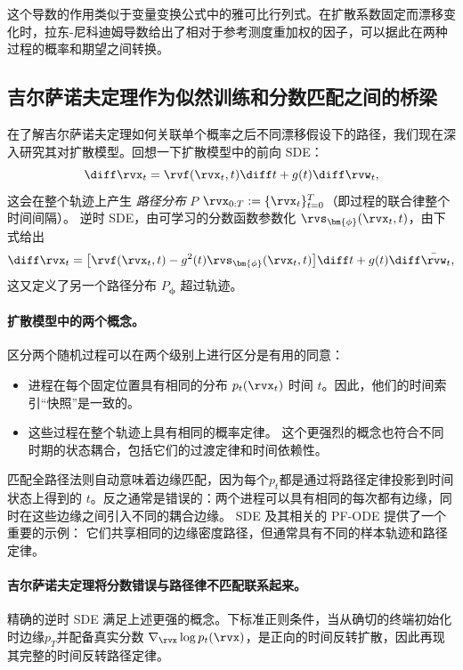 这个导数的作用类似于变量变换公式中的雅可比行列式。在扩散系数固定而漂移变化时，拉东-尼科迪姆导数给出了相对于参考测度重加权的因子，可以据此在两种过程的概率和期望之间转换。

\subsection{吉尔萨诺夫定理作为似然训练和分数匹配之间的桥梁}\label{subsec:girsanov}

在了解吉尔萨诺夫定理如何关联单个概率之后不同漂移假设下的路径，我们现在深入研究其对扩散模型。回想一下扩散模型中的前向 SDE：
\[
\diff \rvx_t = \rvf(\rvx_t, t) \diff t + g(t) \diff \rvw_t,
\]
这会在整个轨迹上产生 \emph{ 路径分布 } $P$
$\rvx_{0:T} := \{\rvx_t\}_{t=0}^T$（即过程的联合律整个时间间隔）。
逆时 SDE，由可学习的分数函数参数化
$\rvs_{\bm{\phi}}(\rvx_t, t)$，由下式给出
\[
\diff \rvx_t = \big[\rvf(\rvx_t, t) - g^2(t) \rvs_{\bm{\phi}}(\rvx_t, t)\big] \diff t
+ g(t) \diff \bar{\rvw}_t,
\]
这又定义了另一个路径分布
$P_{\bm{\phi}}$ 超过轨迹。


\paragraph{扩散模型中的两个概念。}
区分两个随机过程可以在两个级别上进行区分是有用的同意：
\begin{itemize}
    \item {}
    进程在每个固定位置具有相同的分布 $p_t(\rvx_t)$
    时间 $t$。因此，他们的时间索引“快照”是一致的。

    \item {}
    这些过程在整个轨迹上具有相同的概率定律。
    这个更强烈的概念也符合不同时期的状态耦合，包括它们的过渡定律和时间依赖性。
\end{itemize}

匹配全路径法则自动意味着边缘匹配，因为每个$p_t$都是通过将路径定律投影到时间状态上得到的
$t$。反之通常是错误的：两个进程可以具有相同的每次都有边缘，同时在这些边缘之间引入不同的耦合边缘。 SDE 及其相关的 PF-ODE 提供了一个重要的示例：
它们共享相同的边缘密度路径，但通常具有不同的样本轨迹和路径定律。


\paragraph{吉尔萨诺夫定理将分数错误与路径律不匹配联系起来。}
精确的逆时 SDE 满足上述更强的概念。下标准正则条件，当从确切的终端初始化时边缘$p_T$并配备真实分数
$\nabla_{\rvx}\log p_t(\rvx)$，是正向的时间反转扩散，因此再现其完整的时间反转路径定律。

